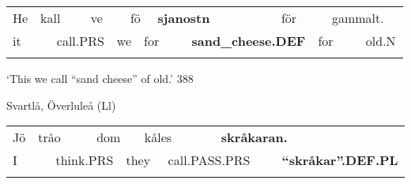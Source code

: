 \begin{tabular}{llllllllllllll}
\lsptoprule
He & \multicolumn{2}{l}{kall

} & \multicolumn{2}{l}{ve

} & \multicolumn{2}{l}{fö

} & \multicolumn{2}{l}{{\bfseries sjanostn}

} & \multicolumn{2}{l}{för

} & \multicolumn{2}{l}{gammalt.

} & \\
\multicolumn{2}{l}{it

} & \multicolumn{2}{l}{call.PRS

} & \multicolumn{2}{l}{we

} & \multicolumn{2}{l}{for

} & \multicolumn{2}{l}{{\bfseries sand\_cheese.DEF}

} & \multicolumn{2}{l}{for

} & \multicolumn{2}{l}{old.N

}\\
\lspbottomrule
\end{tabular}

\begin{styleTranslation}
‘This we call “sand cheese” of old.’ 388

\end{styleTranslation}

\begin{listWWNumileveli}
\item {}

\begin{styleExample}
Svartlå, Överluleå (Ll)

\end{styleExample}

\end{listWWNumileveli}

\begin{tabular}{llllllllll}
\lsptoprule
Jö & \multicolumn{2}{l}{tråo

} & \multicolumn{2}{l}{dom

} & \multicolumn{2}{l}{kåles

} & \multicolumn{2}{l}{{\bfseries skråkaran.}

} & \\
\multicolumn{2}{l}{I

} & \multicolumn{2}{l}{think.PRS

} & \multicolumn{2}{l}{they

} & \multicolumn{2}{l}{call.PASS.PRS

} & \multicolumn{2}{l}{{\bfseries “skråkar”.DEF.PL}

}\\
\lspbottomrule
\end{tabular}

